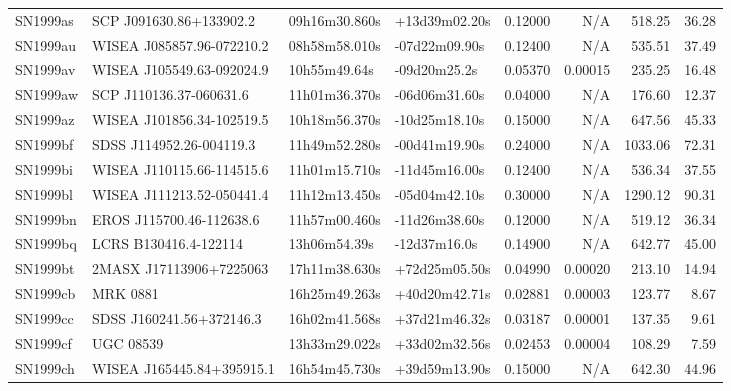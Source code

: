 \begin{longtable}{llllrrrr}
SN1999as         &         SCP J091630.86+133902.2 &   09h16m30.860s &   +13d39m02.20s &  0.12000 &      N/A &   518.25 &       36.28 \\
SN1999au         &       WISEA J085857.96-072210.2 &   08h58m58.010s &   -07d22m09.90s &  0.12400 &      N/A &   535.51 &       37.49 \\
SN1999av         &       WISEA J105549.63-092024.9 &    10h55m49.64s &    -09d20m25.2s &  0.05370 &  0.00015 &   235.25 &       16.48 \\
SN1999aw         &         SCP J110136.37-060631.6 &   11h01m36.370s &   -06d06m31.60s &  0.04000 &      N/A &   176.60 &       12.37 \\
SN1999az         &       WISEA J101856.34-102519.5 &   10h18m56.370s &   -10d25m18.10s &  0.15000 &      N/A &   647.56 &       45.33 \\
SN1999bf         &        SDSS J114952.26-004119.3 &   11h49m52.280s &   -00d41m19.90s &  0.24000 &      N/A &  1033.06 &       72.31 \\
SN1999bi         &       WISEA J110115.66-114515.6 &   11h01m15.710s &   -11d45m16.00s &  0.12400 &      N/A &   536.34 &       37.55 \\
SN1999bl         &       WISEA J111213.52-050441.4 &   11h12m13.450s &   -05d04m42.10s &  0.30000 &      N/A &  1290.12 &       90.31 \\
SN1999bn         &        EROS J115700.46-112638.6 &   11h57m00.460s &   -11d26m38.60s &  0.12000 &      N/A &   519.12 &       36.34 \\
SN1999bq         &           LCRS B130416.4-122114 &    13h06m54.39s &    -12d37m16.0s &  0.14900 &      N/A &   642.77 &       45.00 \\
SN1999bt         &         2MASX J17113906+7225063 &   17h11m38.630s &   +72d25m05.50s &  0.04990 &  0.00020 &   213.10 &       14.94 \\
SN1999cb         &                        MRK 0881 &   16h25m49.263s &   +40d20m42.71s &  0.02881 &  0.00003 &   123.77 &        8.67 \\
SN1999cc         &        SDSS J160241.56+372146.3 &   16h02m41.568s &   +37d21m46.32s &  0.03187 &  0.00001 &   137.35 &        9.61 \\
SN1999cf         &                       UGC 08539 &   13h33m29.022s &   +33d02m32.56s &  0.02453 &  0.00004 &   108.29 &        7.59 \\
SN1999ch         &       WISEA J165445.84+395915.1 &   16h54m45.730s &   +39d59m13.90s &  0.15000 &      N/A &   642.30 &       44.96 \\

\end{longtable}
